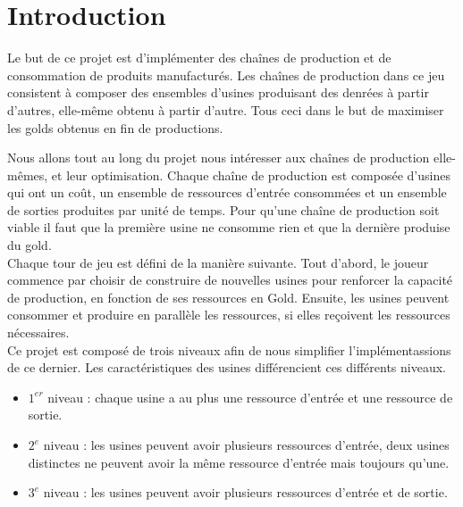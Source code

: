 \section{Introduction}

Le but de ce projet est d'implémenter des chaînes de production et de consommation de produits manufacturés. Les chaînes de production dans ce jeu consistent à composer des ensembles d'usines produisant des denrées à partir d'autres, elle-même obtenu à partir d'autre. Tous ceci dans le but de maximiser les golds obtenus en fin de productions. 


\indent Nous allons tout au long du projet nous intéresser aux chaînes de production elle-mêmes, et leur optimisation. Chaque chaîne de production est composée d'usines qui ont un coût, un ensemble de ressources d'entrée consommées  et un ensemble de sorties produites par unité de temps. Pour qu'une chaîne de production soit viable il faut que la première usine ne consomme rien et que la dernière produise du gold.\\

\indent Chaque tour de jeu est défini de la manière suivante. Tout d'abord, le joueur commence par choisir de construire de nouvelles usines pour renforcer la capacité de production, en fonction de ses ressources en Gold. Ensuite, les usines peuvent consommer et produire en parallèle les ressources, si elles reçoivent les ressources nécessaires.\\

\indent Ce projet est composé de trois niveaux afin de nous simplifier l'implémentassions de ce dernier. Les caractéristiques des usines différencient ces différents niveaux. 
\begin{itemize}
    \item  $1^{er}$ niveau : chaque usine a au plus une ressource d'entrée et une ressource de sortie. 
    \item $2^{e}$ niveau : les usines peuvent avoir plusieurs ressources d'entrée, deux usines distinctes ne peuvent avoir la même ressource d'entrée mais toujours qu'une.
    \item  $3^{e}$ niveau : les usines peuvent avoir plusieurs ressources d'entrée et de sortie.
\end{itemize}



